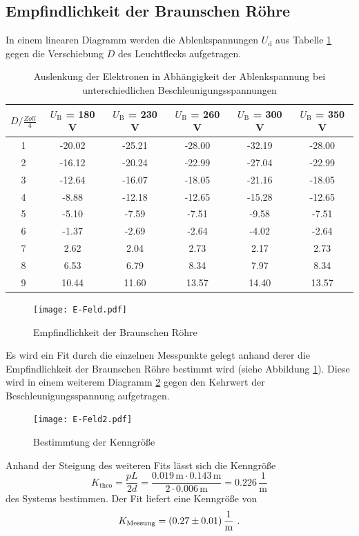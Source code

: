 \subsection{Empfindlichkeit der Braunschen Röhre}
In einem linearen Diagramm werden die Ablenkspannungen $U_\text{d}$ aus Tabelle \ref{tab:DIS} gegen die Verschiebung $D$ des Leuchtflecks aufgetragen.
\begin{table}
  \centering
  \begin{tabular}{c| c c c c c }
    \toprule
    $D / \frac{Zoll}{4}$ & $U_\text{B}$ = 180 V & $U_\text{B}$ = 230 V & $U_\text{B}$ = 260 V & $U_\text{B}$ = 300 V & $U_\text{B}$ = 350 V \\
    \midrule
    1 &	-20.02	&-25.21	&-28.00	&-32.19	&-28.00	\\
    2 &	-16.12	&-20.24	&-22.99	&-27.04	&-22.99	\\
    3 &	-12.64	&-16.07	&-18.05	&-21.16	&-18.05	\\
    4 &	-8.88	&-12.18	&-12.65	&-15.28	&-12.65	\\
    5 &	-5.10	&-7.59	&-7.51	&-9.58	&-7.51	\\
    6 &	-1.37	&-2.69	&-2.64	&-4.02	&-2.64	\\
    7 &	2.62	&2.04	&2.73	&2.17	&2.73	\\
    8 &	6.53	&6.79	&8.34	&7.97	&8.34	\\
    9 &	10.44	&11.60	&13.57	&14.40	&13.57	\\
    \bottomrule
  \end{tabular}
  \caption{Auslenkung der Elektronen in Abhängigkeit der Ablenkspannung bei unterschiedlichen Beschleunigungsspannungen}
  \label{tab:DIS}
\end{table}
\begin{figure}
  \centering
  \texttt{[image: E-Feld.pdf]}
  \caption{Empfindlichkeit der Braunschen Röhre}
  \label{fig:empf}
\end{figure}
Es wird ein Fit durch die einzelnen Messpunkte gelegt anhand derer die Empfindlichkeit der Braunschen Röhre bestimmt wird (siehe Abbildung \ref{fig:empf}). Diese wird in einem weiterem Diagramm \ref{fig:K} gegen den Kehrwert der Beschleunigungsspannung aufgetragen.
\begin{figure}
  \centering
  \texttt{[image: E-Feld2.pdf]}
  \caption{Bestimmtung der Kenngröße}
  \label{fig:K}
\end{figure}
Anhand der Steigung des weiteren Fits lässt sich die Kenngröße
\begin{equation}
  K_\text{theo} = \frac{p L}{2 d} = \frac{0.019 \, \text{m} \cdot 0.143 \, \text{m}}{2 \cdot 0.006 \, \text{m}} = 0.226 \, \frac{1}{\text{m}}
  \label{eqn:Ktheo}
\end{equation}
des Systems bestimmen. Der Fit liefert eine Kenngröße von
\begin{equation}
  K_\text{Messung} = (\num{0.27 +- 0.01}) \, \frac{1}{\text{m}} \ .
  \label{Kmess}
\end{equation}
